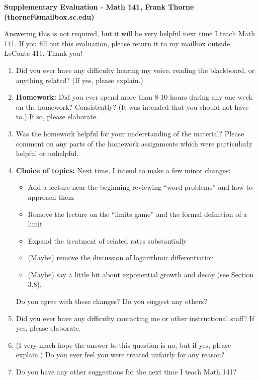 \documentclass[12pt]{article}
\begin{document}
\setlength{\topmargin}{-2mm}





\begin{center}{\bf Supplementary Evaluation - Math 141, Frank Thorne (thornef@mailbox.sc.edu)}
\end{center}
\begin{center}
\end{center}

Answering this is not required, but it will be very helpful next time I teach Math 141. If you fill
out this evaluation, please return it to my mailbox outside LeConte 411. Thank you!

\begin{enumerate}[(1)]
\item
Did you ever have any difficulty hearing my voice, reading the blackboard, or anything related?
(If yes, please explain.)

\vskip 1in
\item
{\bf Homework:} Did you ever spend more than 8-10 hours during any one week on the homework? Consistently?
(It was intended that you should not have to.) If so, please elaborate.

\vskip 2in
\item
Was the homework helpful for your understanding of the material? Please comment on any parts of the homework
assignments which were particularly helpful or unhelpful.
\newpage
\vskip 2in
\item
{\bf Choice of topics:} Next time, I intend to make a few minor changes:

\begin{itemize}
\item
Add a lecture near the beginning reviewing ``word problems'' and how to approach them
\item
Remove the
lecture on the ``limits game'' and the formal definition of a limit
\item Expand the treatment of related
rates substantially
\item (Maybe) remove the discussion of logarithmic differentiation
\item (Maybe) say a little
bit about exponential growth and decay (see Section 3.8).
\end{itemize}
Do you agree with these changes? Do you suggest any others?

\vskip 2in
\item
Did you ever have any difficulty contacting me or other instructional staff? If yes, please elaborate.

\vskip 1in
\item
(I very much hope the answer to this question is no, but if yes, please explain.) Do you ever feel you were
treated unfairly for any reason?

\vskip 1in
\item
Do you have any other suggestions for the next time I teach Math 141?
\end{enumerate}
\end{document}
